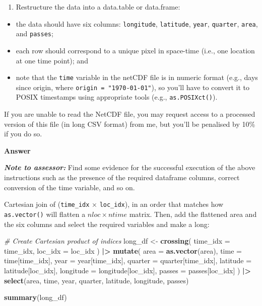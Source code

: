 \documentclass[
  british,
  10pt,
]{article}
\newenvironment{Shaded}{\begin{snugshade}}{\end{snugshade}}
\newcommand{\AttributeTok}[1]{\textcolor[rgb]{0.13,0.29,0.53}{#1}}
\newcommand{\CommentTok}[1]{\textcolor[rgb]{0.56,0.35,0.01}{\textit{#1}}}
\newcommand{\FunctionTok}[1]{\textcolor[rgb]{0.13,0.29,0.53}{\textbf{#1}}}
\newcommand{\NormalTok}[1]{#1}
\newcommand{\OtherTok}[1]{\textcolor[rgb]{0.56,0.35,0.01}{#1}}
\newcommand{\SpecialCharTok}[1]{\textcolor[rgb]{0.81,0.36,0.00}{\textbf{#1}}}
\providecommand{\tightlist}{%
  \setlength{\itemsep}{0pt}\setlength{\parskip}{0pt}}
\let\oldtexttt\texttt
\renewcommand{\texttt}[1]{\oldtexttt{\small #1}}
\begin{document}
\begin{enumerate}
\def\labelenumi{\arabic{enumi}.}
\setcounter{enumi}{1}
\tightlist
\item
  Restructure the data into a data.table or data.frame:
\end{enumerate}

\begin{itemize}
\tightlist
\item
  the data should have six columns: \texttt{longitude},
  \texttt{latitude}, \texttt{year}, \texttt{quarter}, \texttt{area}, and
  \texttt{passes};
\item
  each row should correspond to a unique pixel in space-time (i.e., one
  location at one time point); and
\item
  note that the \texttt{time} variable in the netCDF file is in numeric
  format (e.g., days since origin, where
  \texttt{origin\ =\ "1970-01-01"}), so you'll have to convert it to
  POSIX timestamps using appropriate tools (e.g.,
  \texttt{as.POSIXct()}).
\end{itemize}

If you are unable to read the NetCDF file, you may request access to a
processed version of this file (in long CSV format) from me, but you'll
be penalised by 10\% if you do so.

\textbf{Answer}

\textbf{\emph{Note to assessor:}} Find some evidence for the successful
execution of the above instructions such as the presence of the required
dataframe columns, correct conversion of the time variable, and so on.

Cartesian join of (\texttt{time\_idx} × \texttt{loc\_idx}), in an order
that matches how \texttt{as.vector()} will flatten a \(nloc × ntime\)
matrix. Then, add the flattened area and the six columns and select the
required variables and make a long:

\begin{Shaded}
\begin{Highlighting}[]
\CommentTok{\# Create Cartesian product of indices}
\NormalTok{long\_df }\OtherTok{\textless{}{-}} \FunctionTok{crossing}\NormalTok{(}
  \AttributeTok{time\_idx =}\NormalTok{ time\_idx,}
  \AttributeTok{loc\_idx =}\NormalTok{ loc\_idx}
\NormalTok{) }\SpecialCharTok{|\textgreater{}} 
  \FunctionTok{mutate}\NormalTok{(}
    \AttributeTok{area =} \FunctionTok{as.vector}\NormalTok{(area),}
    \AttributeTok{time =}\NormalTok{ time[time\_idx],}
    \AttributeTok{year =}\NormalTok{ year[time\_idx],}
    \AttributeTok{quarter =}\NormalTok{ quarter[time\_idx],}
    \AttributeTok{latitude =}\NormalTok{ latitude[loc\_idx],}
    \AttributeTok{longitude =}\NormalTok{ longitude[loc\_idx],}
    \AttributeTok{passes =}\NormalTok{ passes[loc\_idx]}
\NormalTok{  ) }\SpecialCharTok{|\textgreater{}} 
  \FunctionTok{select}\NormalTok{(area, time, year, quarter, latitude, longitude, passes)}

\FunctionTok{summary}\NormalTok{(long\_df)}
\end{Highlighting}
\end{Shaded}
\end{document}
